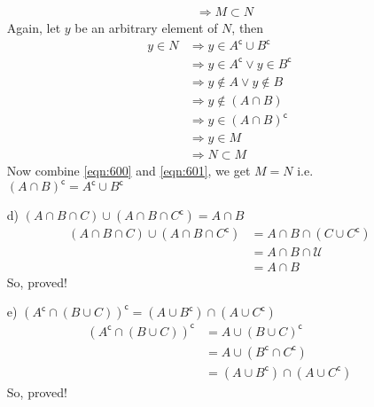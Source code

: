 \begin{enumerate}
\begin{align}
            &\Rightarrow M \subset N \label{eqn:600}
      \end{align}
      Again, let $y$ be an arbitrary element of $N$, then
      \begin{align}
            y \in N &\Rightarrow y \in A^\mathsf{c} \cup B^\mathsf{c} \\
            &\Rightarrow y \in A^\mathsf{c} \lor y \in B^\mathsf{c} \\
            &\Rightarrow y \notin A \lor y \notin B \\
            &\Rightarrow y \notin (A \cap B) \\
            &\Rightarrow y \in (A \cap B)^\mathsf{c} \\
            &\Rightarrow y \in M \\
            &\Rightarrow N \subset M \label{eqn:601}
      \end{align}
      Now combine \ref{eqn:600} and \ref{eqn:601}, we get $M = N$ i.e. $(A \cap B)^\mathsf{c} = A^\mathsf{c} \cup B^\mathsf{c}$
\item[d)] $(A\cap B\cap C)\cup(A\cap B\cap C^\mathsf{c})= A\cap B$
      \begin{align}
            (A\cap B\cap C)\cup(A\cap B\cap C^\mathsf{c})
            &= A\cap B\cap (C\cup C^\mathsf{c}) \\
            &= A\cap B\cap\mathcal U \\
            &= A\cap B
      \end{align} 
      So, proved!
\item[e)] $(A^\mathsf{c}\cap(B\cup C))^\mathsf{c} = (A\cup B^\mathsf{c})\cap(A\cup C^\mathsf{c})$ \\
      \begin{align}
            (A^\mathsf{c}\cap(B\cup C))^\mathsf{c}
            &= A\cup(B\cup C)^\mathsf{c} \\
            &= A\cup(B^\mathsf{c}\cap C^\mathsf{c}) \\
            &= (A\cup B^\mathsf{c})\cap(A\cup C^\mathsf{c})
      \end{align} 
      So, proved!
\end{enumerate}
